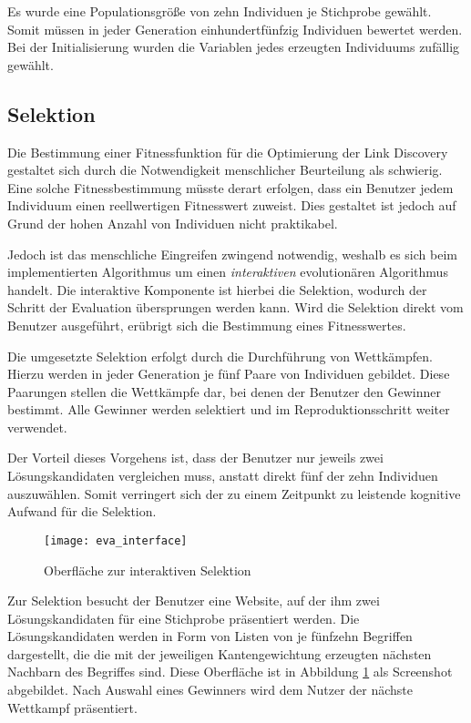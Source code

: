 Es wurde eine Populationsgröße von zehn Individuen je Stichprobe gewählt. Somit müssen in jeder Generation einhundertfünfzig Individuen bewertet werden. Bei der Initialisierung wurden die Variablen jedes erzeugten Individuums zufällig gewählt.

\subsection{Selektion}

Die Bestimmung einer Fitnessfunktion für die Optimierung der Link Discovery gestaltet sich durch die Notwendigkeit menschlicher Beurteilung als schwierig. Eine solche Fitnessbestimmung müsste derart erfolgen, dass ein Benutzer jedem Individuum einen reellwertigen Fitnesswert zuweist. Dies gestaltet ist jedoch auf Grund der hohen Anzahl von Individuen nicht praktikabel.

Jedoch ist das menschliche Eingreifen zwingend notwendig, weshalb es sich beim implementierten Algorithmus um einen \emph{interaktiven} evolutionären Algorithmus \cite{ht2001} handelt. Die interaktive Komponente ist hierbei die Selektion, wodurch der Schritt der Evaluation übersprungen werden kann. Wird die Selektion direkt vom Benutzer ausgeführt, erübrigt sich die Bestimmung eines Fitnesswertes.

Die umgesetzte Selektion erfolgt durch die Durchführung von Wettkämpfen. Hierzu werden in jeder Generation je fünf Paare von Individuen gebildet. Diese Paarungen stellen die Wettkämpfe dar, bei denen der Benutzer den Gewinner bestimmt. Alle Gewinner werden selektiert und im Reproduktionsschritt weiter verwendet.

Der Vorteil dieses Vorgehens ist, dass der Benutzer nur jeweils zwei Lösungskandidaten vergleichen muss, anstatt direkt fünf der zehn Individuen auszuwählen. Somit verringert sich der zu einem Zeitpunkt zu leistende kognitive Aufwand für die Selektion.

\begin{figure}
\centering
\texttt{[image: eva\_interface]}
\caption{Oberfläche zur interaktiven Selektion}
\label{fig:eva_interface}
\end{figure}

Zur Selektion besucht der Benutzer eine Website, auf der ihm zwei Lösungskandidaten für eine Stichprobe präsentiert werden. Die Lösungskandidaten werden in Form von Listen von je fünfzehn Begriffen dargestellt, die die mit der jeweiligen Kantengewichtung erzeugten nächsten Nachbarn des Begriffes sind. Diese Oberfläche ist in Abbildung \ref{fig:eva_interface} als Screenshot abgebildet. Nach Auswahl eines Gewinners wird dem Nutzer der nächste Wettkampf präsentiert.

